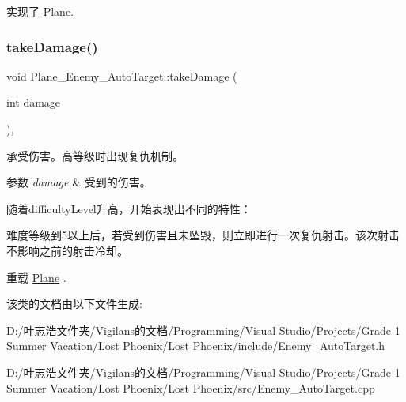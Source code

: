 实现了 \hyperlink{class_plane}{Plane}.

\mbox{\label{class_plane___enemy___auto_target_a1f9400c23995c6ac67fe04309f98cf29}} 
\subsubsection{\texorpdfstring{take\+Damage()}{takeDamage()}}
{\footnotesize\ttfamily void Plane\+\_\+\+Enemy\+\_\+\+Auto\+Target\+::take\+Damage (\begin{DoxyParamCaption}\item[{int}]{damage }\end{DoxyParamCaption})\hspace{0.3cm}{\ttfamily [override]}, {\ttfamily [virtual]}}



承受伤害。高等级时出现复仇机制。 


\begin{DoxyParams}{参数}
{\em damage} & 受到的伤害。 \\
\hline
\end{DoxyParams}


随着difficulty\+Level升高，开始表现出不同的特性：
\begin{DoxyItemize}
\item 难度等级到5以上后，若受到伤害且未坠毁，则立即进行一次复仇射击。该次射击不影响之前的射击冷却。 
\end{DoxyItemize}

重载 \hyperlink{class_plane}{Plane} .



该类的文档由以下文件生成\+:\begin{DoxyCompactItemize}
\item 
D\+:/叶志浩文件夹/\+Vigilans的文档/\+Programming/\+Visual Studio/\+Projects/\+Grade 1 Summer Vacation/\+Lost Phoenix/\+Lost Phoenix/include/Enemy\+\_\+\+Auto\+Target.\+h\item 
D\+:/叶志浩文件夹/\+Vigilans的文档/\+Programming/\+Visual Studio/\+Projects/\+Grade 1 Summer Vacation/\+Lost Phoenix/\+Lost Phoenix/src/Enemy\+\_\+\+Auto\+Target.\+cpp\end{DoxyCompactItemize}
